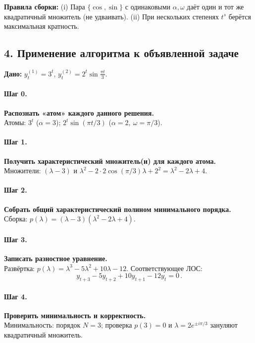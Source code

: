 \textbf{Правила сборки:} (i) Пара \(\{\cos,\sin\}\) с одинаковыми \(\alpha,\omega\) даёт один и тот же квадратичный множитель (не удваивать). (ii) При нескольких степенях \(t^{s}\) берётся максимальная кратность.

\subsection*{4. Применение алгоритма к объявленной задаче}

\textbf{Дано:} \(y^{(1)}_t=3^{t}\), \(y^{(2)}_t=2^{t}\sin\!\frac{\pi t}{3}\).

\paragraph{Шаг 0.} \textbf{Распознать «атом» каждого данного решения.}\\
Атомы: \(3^t\) (\(\alpha=3\)); \(2^t\sin(\pi t/3)\) (\(\alpha=2,\ \omega=\pi/3\)).

\paragraph{Шаг 1.} \textbf{Получить характеристический множитель(и) для каждого атома.}\\
Множители: \((\lambda-3)\) и \(\lambda^2-2\cdot 2\cos(\pi/3)\lambda+2^2=\lambda^2-2\lambda+4\).

\paragraph{Шаг 2.} \textbf{Собрать общий характеристический полином минимального порядка.}\\
Сборка: \(p(\lambda)=(\lambda-3)(\lambda^2-2\lambda+4)\).

\paragraph{Шаг 3.} \textbf{Записать разностное уравнение.}\\
Развёртка: \(p(\lambda)=\lambda^3-5\lambda^2+10\lambda-12\).
Соответствующее ЛОС:
\[
\boxed{\,y_{t+3}-5y_{t+2}+10y_{t+1}-12y_t=0\,}.
\]

\paragraph{Шаг 4.} \textbf{Проверить минимальность и корректность.}\\
Минимальность: порядок \(N=3\); проверка \(p(3)=0\) и \(\lambda=2e^{\pm i\pi/3}\) зануляют квадратичный множитель.

